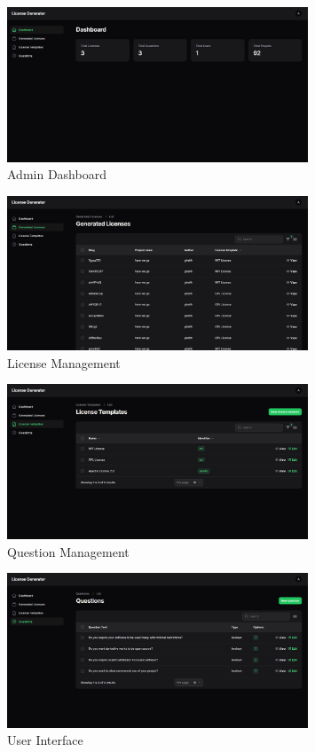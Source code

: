 \documentclass[12pt,a4paper]{report}
\begin{document}
\begin{figure}[H]
    \centering
    \includegraphics[width=0.8\textwidth]{Screenshots/os4.png}
    \caption{Admin Dashboard}
\end{figure}

\begin{figure}[H]
    \centering
    \includegraphics[width=0.8\textwidth]{Screenshots/os5.png}
    \caption{License Management}
\end{figure}

\begin{figure}[H]
    \centering
    \includegraphics[width=0.8\textwidth]{Screenshots/os6.png}
    \caption{Question Management}
\end{figure}

\begin{figure}[H]
    \centering
    \includegraphics[width=0.8\textwidth]{Screenshots/os7.png}
    \caption{User Interface}
\end{figure}
\end{document}
